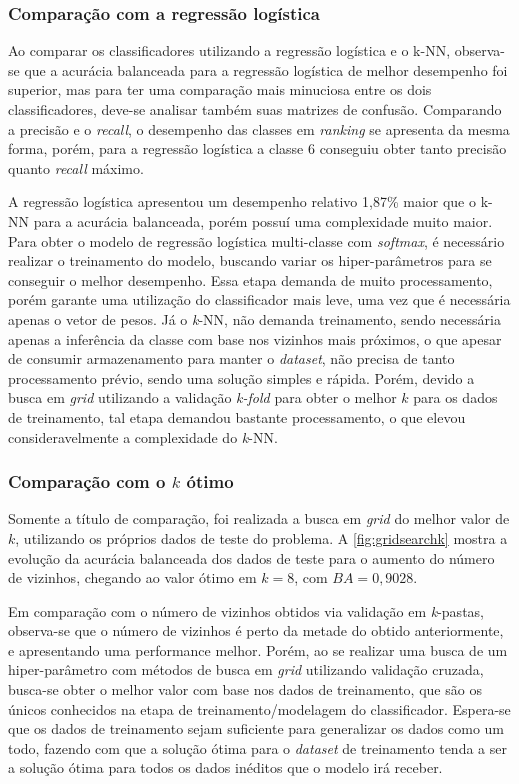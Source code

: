 \subsubsection*{Comparação com a regressão logística}

Ao comparar os classificadores utilizando a regressão logística e o k-NN, observa-se que a acurácia balanceada para a regressão logística de melhor desempenho foi superior, mas para ter uma comparação mais minuciosa entre os dois classificadores, deve-se analisar também suas matrizes de confusão. Comparando a precisão e o \textit{recall}, o desempenho das classes em \textit{ranking} se apresenta da mesma forma, porém, para a regressão logística a classe 6 conseguiu obter tanto precisão quanto \textit{recall} máximo.

A regressão logística apresentou um desempenho relativo 1,87\% maior que o k-NN para a acurácia balanceada, porém possuí uma complexidade muito maior. Para obter o modelo de regressão logística multi-classe com \textit{softmax}, é necessário realizar o treinamento do modelo, buscando variar os hiper-parâmetros para se conseguir o melhor desempenho. Essa etapa demanda de muito processamento, porém garante uma utilização do classificador mais leve, uma vez que é necessária apenas o vetor de pesos. Já o \textit{k}-NN, não demanda treinamento, sendo necessária apenas a inferência da classe com base nos vizinhos mais próximos, o que apesar de consumir armazenamento para manter o \textit{dataset}, não precisa de tanto processamento prévio, sendo uma solução simples e rápida. Porém, devido a busca em \textit{grid} utilizando a validação \textit{k-fold} para obter o melhor $k$ para os dados de treinamento, tal etapa demandou bastante processamento, o que elevou consideravelmente a complexidade do \textit{k}-NN.

\subsubsection*{Comparação com o $k$ ótimo}

Somente a título de comparação, foi realizada a busca em \textit{grid} do melhor valor de $k$, utilizando os próprios dados de teste do problema. A \autoref{fig:gridsearchk} mostra a evolução da acurácia balanceada dos dados de teste para o aumento do número de vizinhos, chegando ao valor ótimo em $k = 8$, com $BA = 0,9028$. 

Em comparação com o número de vizinhos obtidos via validação em \textit{k}-pastas, observa-se que o número de vizinhos é perto da metade do obtido anteriormente, e apresentando uma performance melhor. Porém, ao se realizar uma busca de um hiper-parâmetro com métodos de busca em \textit{grid} utilizando validação cruzada, busca-se obter o melhor valor com base nos dados de treinamento, que são os únicos conhecidos na etapa de treinamento/modelagem do classificador. Espera-se que os dados de treinamento sejam suficiente para generalizar os dados como um todo, fazendo com que a solução ótima para o \textit{dataset} de treinamento tenda a ser a solução ótima para todos os dados inéditos que o modelo irá receber.

